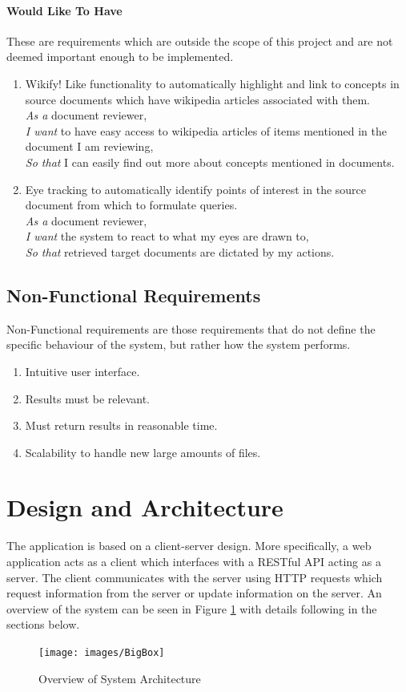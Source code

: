 \documentclass{l4proj}
\begin{document}
\paragraph{Would Like To Have}
These are requirements which are outside the scope of this project and are not deemed important enough to be implemented.
\begin{enumerate}[label=\textbf{W.\arabic*}]
\item Wikify! Like functionality to automatically highlight and link to concepts in source documents which have wikipedia articles associated with them. \\
\textit{As a} document reviewer, \\
\textit{I want} to have easy access to wikipedia articles of items mentioned in the document I am reviewing, \\
\textit{So that} I can easily find out more about concepts mentioned in documents.
\item Eye tracking to automatically identify points of interest in the source document from which to formulate queries. \\
\textit{As a} document reviewer, \\
\textit{I want} the system to react to what my eyes are drawn to, \\
\textit{So that} retrieved target documents are dictated by my actions.
\end{enumerate}
\subsection{Non-Functional Requirements}
Non-Functional requirements are those requirements that do not define the specific behaviour of the system, but rather how the system performs.
\begin{enumerate}[label=\textbf{NF.\arabic*}]
\item Intuitive user interface.
\item Results must be relevant.
\item Must return results in reasonable time.
\item Scalability to handle new large amounts of files. 
\end{enumerate}

\section{Design and Architecture}
The application is based on a client-server design. More specifically, a web application acts as a client which interfaces with a RESTful API acting as a server.
The client communicates with the server using HTTP requests which request information from the server or update information on the server. An overview of the system can be seen in Figure \ref{architecture} with details following in the sections below.
\begin{figure}[H]
\centering
\texttt{[image: images/BigBox]}
\caption{Overview of System Architecture}
\label{architecture}
\end{figure}
\end{document}
